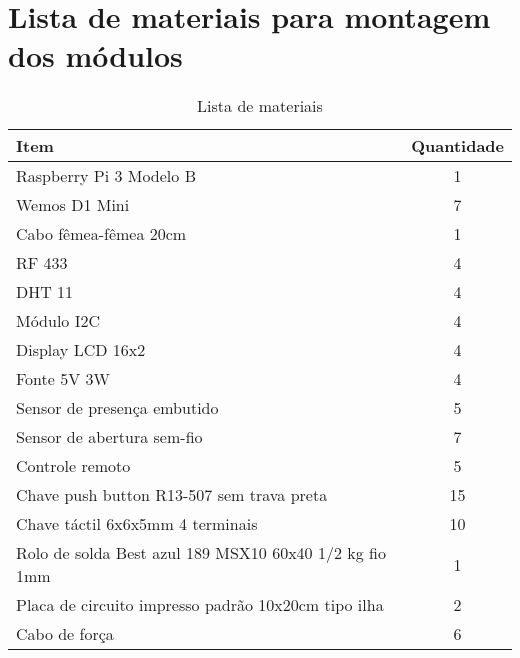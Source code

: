 \chapter{Lista de materiais para montagem dos módulos}
\label{listamateriais}

\begin{table}[hbp]
    \caption{Lista de materiais}
    \begin{tabular}{lc}
        \toprule
        \textbf{Item} & \textbf{Quantidade} \\
        \midrule
        Raspberry Pi 3 Modelo B                                & 1                   \\
        Wemos D1 Mini                                          & 7                   \\
        Cabo fêmea-fêmea 20cm                                  & 1                   \\
        RF 433                                                 & 4                   \\
        DHT 11                                                 & 4                   \\
        Módulo I2C                                             & 4                   \\
        Display LCD 16x2                                       & 4                   \\
        Fonte 5V 3W                                            & 4                   \\
        Sensor de presença embutido                            & 5                   \\
        Sensor de abertura sem-fio                             & 7                   \\
        Controle remoto                                        & 5                   \\
        Chave push button R13-507 sem trava preta              & 15                  \\
        Chave táctil 6x6x5mm 4 terminais                       & 10                  \\
        Rolo de solda Best azul 189 MSX10 60x40 1/2 kg fio 1mm & 1                   \\
        Placa de circuito impresso padrão 10x20cm tipo ilha    & 2                   \\
        Cabo de força                                          & 6                   \\

\end{tabular}
\end{table}
